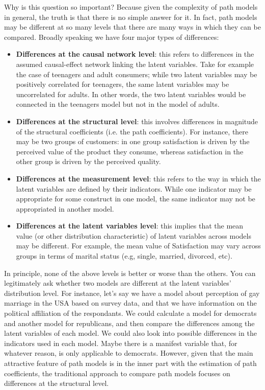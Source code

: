 \documentclass[12pt]{book}\usepackage{graphicx, color}
\begin{document}
Why is this question so important? Because given the complexity of path models in general, the truth is that there is no simple answer for it. In fact, path models may be different at so many levels that there are many ways in which they can be compared. Broadly speaking we have four major types of differences:

\begin{itemize}
 \item \textbf{Differences at the causal network level}: this refers to differences in the assumed causal-effect network linking the latent variables. Take for example the case of teenagers and adult consumers; while two latent variables may be positively correlated for teenagers, the same latent variables may be uncorrelated for adults. In other words, the two latent variables would be connected in the teenagers model but not in the model of adults.
 
 \item \textbf{Differences at the structural level}: this involves differences in magnitude of the structural coefficients (i.e. the path coefficients). For instance, there may be two groups of customers: in one group satisfaction is driven by the perceived value of the product they consume, whereas satisfaction in the other group is driven by the perceived quality.
 
 \item \textbf{Differences at the measurement level}: this refers to the way in which the latent variables are defined by their indicators. While one indicator may be appropriate for some construct in one model, the same indicator may not be appropriated in another model.
 
 \item \textbf{Differences at the latent variables level}: this implies that the mean value (or other distribution characteristic) of latent variables across models may be different. For example, the mean value of Satisfaction may vary across groups in terms of marital status (e.g, single, married, divorced, etc).
\end{itemize}

\vspace{2mm}
In principle, none of the above levels is better or worse than the others. You can legitimately ask whether two models are different at the latent variables' distribution level. For instance, let's say we have a model about perception of gay marriage in the USA based on survey data, and that we have information on the political affiliation of the respondants. We could calculate a model for democrats and another model for republicans, and then compare the differences among the latent variables of each model. We could also look into possible differences in the indicators used in each model. Maybe there is a manifest variable that, for whatever reason, is only applicable to democrats. However, given that the main attractive feature of path models is in the inner part with the estimation of path coefficients, the traditional approach to compare path models focuses on differences at the structural level.
\end{document}
